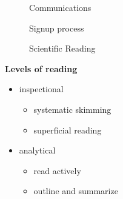 \begin{frame}
\begin{figure}[htp]\centering
\caption{Communications}
\end{figure}
\end{frame}
\begin{frame}
\begin{figure}[htp]\centering
\caption{Signup process}
\end{figure}
\end{frame}
\begin{frame}
\begin{figure}[htp]\centering
\caption{Scientific Reading}
\end{figure}
\nocite{Adler.1972}\nocite{Keshav2016}
\end{frame}
\begin{frame}

\textbf{Levels of reading}\vspace{0.5cm}
\begin{itemize}\setlength\itemsep{1em}
  \item inspectional\medskip
  \begin{itemize}\setlength\itemsep{1em}
  \item systematic skimming
  \item superficial reading
  \end{itemize}
  \item analytical\medskip
  \begin{itemize}\setlength\itemsep{1em}
  \item read actively
  \item outline and summarize
  \end{itemize}
\end{itemize}

\end{frame}
